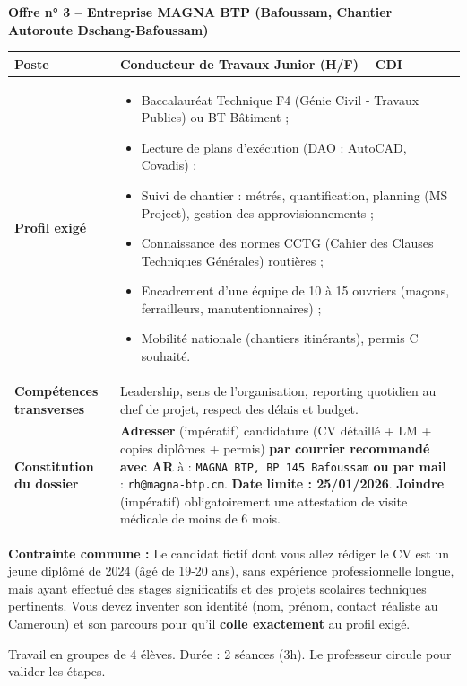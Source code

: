 \documentclass[11pt]{article}
\newcounter{popsec}
\newcounter{popsub}
\newcommand{\courssub}[1]{%
  \stepcounter{popsub}%
  \par\vspace{9pt}\noindent{\popxbold\fontsize{11.5}{13}\selectfont\color{popink}{\color{poporange}\thepopsec.\thepopsub}\hspace{6pt}#1}\par\nopagebreak\vspace{4pt}
}
\begin{document}
\medskip
\noindent
\textbf{Offre n° 3 -- Entreprise MAGNA BTP (Bafoussam, Chantier Autoroute Dschang-Bafoussam)}
\begin{center}
\begin{tabularx}{\linewidth}{|l|X|}\hline
\textbf{Poste} & Conducteur de Travaux Junior (H/F) -- CDI \\ \hline
\textbf{Profil exigé} & \begin{itemize}\item Baccalauréat Technique F4 (Génie Civil - Travaux Publics) ou BT Bâtiment ;\item Lecture de plans d'exécution (DAO : AutoCAD, Covadis) ;\item Suivi de chantier : métrés, quantification, planning (MS Project), gestion des approvisionnements ;\item Connaissance des normes CCTG (Cahier des Clauses Techniques Générales) routières ;\item Encadrement d'une équipe de 10 à 15 ouvriers (maçons, ferrailleurs, manutentionnaires) ;\item Mobilité nationale (chantiers itinérants), permis C souhaité.\end{itemize} \\ \hline
\textbf{Compétences transverses} & Leadership, sens de l'organisation, reporting quotidien au chef de projet, respect des délais et budget. \\ \hline
\textbf{Constitution du dossier} & \textbf{Adresser} (impératif) candidature (CV détaillé + LM + copies diplômes + permis) \textbf{par courrier recommandé avec AR} à : \texttt{MAGNA BTP, BP 145 Bafoussam} \textbf{ou par mail} : \texttt{rh@magna-btp.cm}. \textbf{Date limite : 25/01/2026}. \textbf{Joindre} (impératif) obligatoirement une attestation de visite médicale de moins de 6 mois. \\ \hline
\end{tabularx}
\end{center}

\medskip
\noindent
\textbf{Contrainte commune :} Le candidat fictif dont vous allez rédiger le CV est un jeune diplômé de 2024 (âgé de 19-20 ans), sans expérience professionnelle longue, mais ayant effectué des stages significatifs et des projets scolaires techniques pertinents. Vous devez inventer son identité (nom, prénom, contact réaliste au Cameroun) et son parcours pour qu'il \textbf{colle exactement} au profil exigé.

\courssub{Consignes}
\noindent
Travail en groupes de 4 élèves. Durée : 2 séances (3h). Le professeur circule pour valider les étapes.
\end{document}
